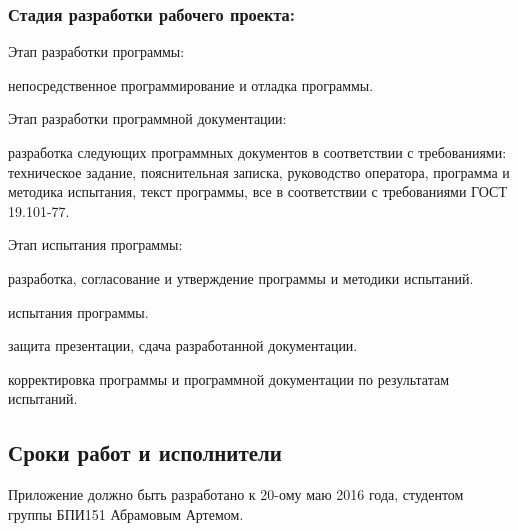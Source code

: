 \subsubsection{Стадия разработки рабочего проекта:}
\begin{my_enumerate}
\item Этап разработки программы:
    \begin{my_enumerate}
    \item непосредственное программирование и отладка программы.
    \end{my_enumerate}
\item Этап разработки программной документации:
    \begin{my_enumerate}
    \item разработка следующих программных документов в соответствии с требованиями: техническое задание, пояснительная записка, руководство оператора, программа и методика испытания, текст программы, все в соответствии с требованиями ГОСТ 19.101-77.
    \end{my_enumerate}
\item Этап испытания программы:    
    \begin{my_enumerate}
    \item разработка, согласование и утверждение программы и методики испытаний.
    \item испытания программы.
    \item защита презентации, сдача разработанной документации.
    \item корректировка программы и программной документации по результатам испытаний.
    \end{my_enumerate}
\end{my_enumerate}


\subsection{Сроки работ и исполнители}
Приложение должно быть разработано к 20-ому маю 2016 года, студентом группы БПИ151 Абрамовым Артемом.
